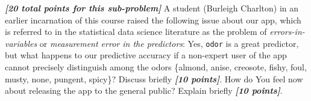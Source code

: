 \documentclass[12pt]{article}
\newcommand{\bi}[1]{\textbf{\textit{#1}}}
\begin{document}
\begin{itemize}
\bi{[20 total points for this sub-problem]} A student (Burleigh Charlton) in an earlier incarnation of this course raised the following issue about our app, which is referred to in the statistical data science literature as the problem of \textit{errors-in-variables} or \textit{measurement error in the predictors}: Yes, \texttt{odor} is a great predictor, but what happens to our predictive accuracy if a non-expert user of the app cannot precisely distinguish among the odors \{almond, anise, creosote, fishy, foul, musty, none, pungent, spicy\}? Discuss briefly \bi{[10 points]}. How do You feel now about releasing the app to the general public? Explain briefly \bi{[10 points]}.

\end{itemize}
\end{document}
